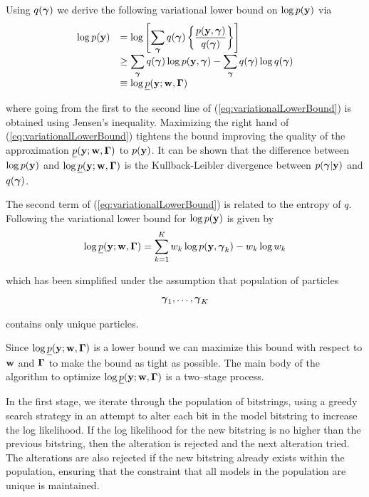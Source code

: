 Using $q({\boldsymbol \gamma})$ we derive the following variational lower bound on $\log
p({\bf y})$ via
\begin{equation}
\label{eq:variationalLowerBound}
\begin{array}{rl}
\displaystyle \log p({\bf y}) 
& \displaystyle = \log \left[ \sum_{{\boldsymbol \gamma}} q({\boldsymbol \gamma}) \left\{  \frac{p({\bf y},{\boldsymbol \gamma})}{q({\boldsymbol \gamma}) } \right\} \right]
\\
& \displaystyle \ge \sum_{{\boldsymbol \gamma}} q({\boldsymbol \gamma}) \log p({\bf y},{\boldsymbol \gamma}) 
- \sum_{{\boldsymbol \gamma}} q({\boldsymbol \gamma}) \log q({\boldsymbol \gamma})
\\
& \displaystyle \equiv \log \underline{p}({\bf y};{\bf w},{\boldsymbol \Gamma})
\end{array}
\end{equation}

\noindent where going from the first to the second line of
(\ref{eq:variationalLowerBound}) is obtained using Jensen's inequality.
Maximizing the right hand  of (\ref{eq:variationalLowerBound}) tightens the
bound improving the quality of the approximation
$\underline{p}({\bf y};{\bf w},{\boldsymbol \Gamma})$ to $p({\bf y})$. It can be shown that the
difference between $\log p({\bf y})$ and $\log \underline{p}({\bf y};{\bf w},{\boldsymbol \Gamma})$ is
the Kullback-Leibler divergence between $p({\boldsymbol \gamma}|{\bf y})$ and $q({\boldsymbol \gamma})$.

The second term of (\ref{eq:variationalLowerBound}) is related to the entropy
of $q$. Following \cite{Rockova2017} the variational lower bound for $\log
p({\bf y})$ is given by
\begin{equation}\label{eq:objective}
\displaystyle \log \underline{p}({\bf y};{\bf w},{\boldsymbol \Gamma}) 
= \sum_{k=1}^K w_k\log p({\bf y},{\boldsymbol \gamma}_k) - w_k \log w_k
\end{equation}

\noindent which has been simplified under the assumption that population of
particles $$
{\boldsymbol \gamma}_1,\ldots,{\boldsymbol \gamma}_K$$

\noindent  contains only unique particles.

Since $\log \underline{p}({\bf y};{\bf w},{\boldsymbol \Gamma})$ is a lower bound we can maximize
this bound with respect to ${\bf w}$ and ${\boldsymbol \Gamma}$ to make the bound as tight as
possible.  The main body of the algorithm to optimize $\log
\underline{p}({\bf y};{\bf w},{\boldsymbol \Gamma})$ is a two--stage process. 

In the first stage, we iterate through the population of bitstrings, using a
greedy search strategy in an attempt to alter each bit in the model bitstring
to increase the log likelihood. If the log likelihood for the new bitstring is
no higher than the previous bitstring, then the alteration is rejected and the
next alteration tried. The alterations are also rejected if the new bitstring
already exists within the population, ensuring that the constraint that all
models in the population are unique is maintained.

